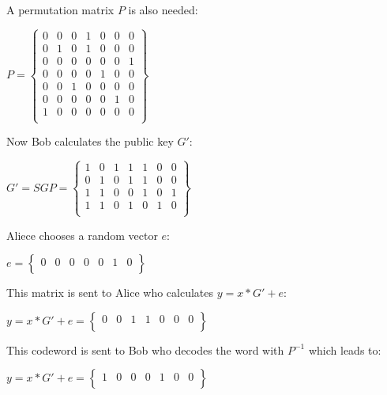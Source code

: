 A permutation matrix $P$ is also needed: 
\begin{center}
	$
	P =
	\begin{Bmatrix}
	0 & 0 & 0 & 1 & 0 & 0 & 0 \\
	0 & 1 & 0 & 1 & 0 & 0 & 0 \\
	0 & 0 & 0 & 0 & 0 & 0 & 1 \\
	0 & 0 & 0 & 0 & 1 & 0 & 0 \\
	0 & 0 & 1 & 0 & 0 & 0 & 0 \\
	0 & 0 & 0 & 0 & 0 & 1 & 0 \\
	1 & 0 & 0 & 0 & 0 & 0 & 0 \\
	
	\end{Bmatrix}
	$
\end{center}
Now Bob calculates the public key $G'$: 
\begin{center}
	$
	G' = SGP =
	\begin{Bmatrix}
	1 & 0 & 1 & 1 & 1 & 0 & 0 \\
	0 & 1 & 0 & 1 & 1 & 0 & 0 \\
	1 & 1 & 0 & 0 & 1 & 0 & 1 \\
	1 & 1 & 0 & 1 & 0 & 1 & 0 \\
	
	\end{Bmatrix}
	$
\end{center}
Aliece chooses a random vector $e$:
\begin{center}
	$
	e =
	\begin{Bmatrix}
	0 & 0 & 0 & 0 & 0 & 1 & 0 \\
	\end{Bmatrix}
	$
\end{center}
This matrix is sent to Alice who calculates $y = x*G'+e$:
\begin{center}
	$
	y = x*G'+e =
	\begin{Bmatrix}
	0 & 0 & 1 & 1 & 0 & 0 & 0 \\
	\end{Bmatrix}
	$
\end{center}
This codeword is sent to Bob who decodes the word with $P^{-1}$ which leads to:
\begin{center}
	$
	y = x*G'+e =
	\begin{Bmatrix}
	1 & 0 & 0 & 0 & 1 & 0 & 0 \\
	\end{Bmatrix}
	$
\end{center}


